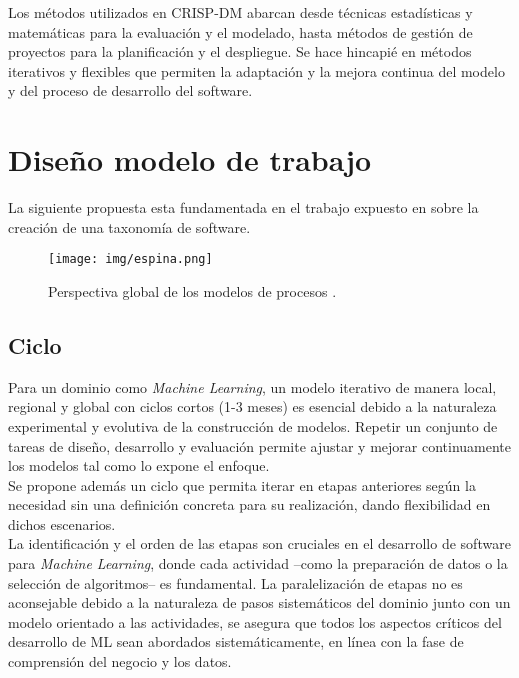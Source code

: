 \documentclass[journal]{IEEEtran}
\begin{document}
Los métodos utilizados en CRISP-DM abarcan desde técnicas estadísticas y matemáticas para la evaluación y el modelado, hasta métodos de gestión de proyectos para la planificación y el despliegue. Se hace hincapié en métodos iterativos y flexibles que permiten la adaptación y la mejora continua del modelo y del proceso de desarrollo del software.\\

\section{Diseño modelo de trabajo}

La siguiente propuesta esta fundamentada en el trabajo expuesto en \cite{Cret2013} sobre la creación de una taxonomía de software.

\begin{figure}[h!]
    \centering
    \texttt{[image: img/espina.png]}
    \caption{Perspectiva global de los modelos de procesos \cite{Cret2013}.}
    \label{fig:espina}
\end{figure}

\subsection{Ciclo}

Para un dominio como \textit{Machine Learning}, un modelo iterativo de manera local, regional y global con ciclos cortos (1-3 meses) es esencial debido a la naturaleza experimental y evolutiva de la construcción de modelos. Repetir un conjunto de tareas de diseño, desarrollo y evaluación permite ajustar y mejorar continuamente los modelos tal como lo expone el enfoque.\\

Se propone además un ciclo que permita iterar en etapas anteriores según la necesidad sin una definición concreta para su realización, dando flexibilidad en dichos escenarios.\\

La identificación y el orden de las etapas son cruciales en el desarrollo de software para \textit{Machine Learning}, donde cada actividad --como la preparación de datos o la selección de algoritmos-- es fundamental. La paralelización de etapas no es aconsejable debido a la naturaleza de pasos sistemáticos del dominio junto con un modelo orientado a las actividades, se asegura que todos los aspectos críticos del desarrollo de ML sean abordados sistemáticamente, en línea con la fase de comprensión del negocio y los datos.\\
\end{document}
